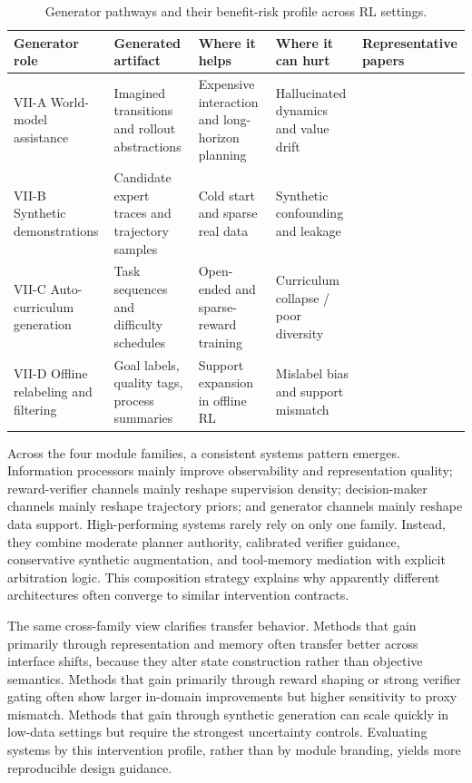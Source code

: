 \documentclass[pdflatex,sn-mathphys-num]{sn-jnl}
\begin{document}
\begin{table}[t]
\centering
\footnotesize
\setlength{\tabcolsep}{4pt}
\begin{tabularx}{\textwidth}{P{2.3cm}P{2.6cm}P{2.1cm}P{2.1cm}Y}
\toprule
\textbf{Generator role} & \textbf{Generated artifact} & \textbf{Where it helps} & \textbf{Where it can hurt} & \textbf{Representative papers}\\
\midrule
VII-A World-model assistance & Imagined transitions and rollout abstractions & Expensive interaction and long-horizon planning & Hallucinated dynamics and value drift & \cite{arxiv_p_2301_12050,arxiv_p_2602_02454,arxiv_p_2602_11075}\\
VII-B Synthetic demonstrations & Candidate expert traces and trajectory samples & Cold start and sparse real data & Synthetic confounding and leakage & \cite{arxiv_p_2310_20587,arxiv_p_2505_18098,arxiv_p_2601_08107}\\
VII-C Auto-curriculum generation & Task sequences and difficulty schedules & Open-ended and sparse-reward training & Curriculum collapse / poor diversity & \cite{arxiv_p_2512_16848,arxiv_p_2601_18225,arxiv_p_2601_20802}\\
VII-D Offline relabeling and filtering & Goal labels, quality tags, process summaries & Support expansion in offline RL & Mislabel bias and support mismatch & \cite{arxiv_p_2602_02137,arxiv_p_2602_03305,doi_p_10_14778_3685800_3685913}\\
\bottomrule
\end{tabularx}
\caption{Generator pathways and their benefit-risk profile across RL settings.}
\label{tab:t4_generator}
\end{table}

Across the four module families, a consistent systems pattern emerges. Information processors mainly improve observability and representation quality; reward-verifier channels mainly reshape supervision density; decision-maker channels mainly reshape trajectory priors; and generator channels mainly reshape data support. High-performing systems rarely rely on only one family. Instead, they combine moderate planner authority, calibrated verifier guidance, conservative synthetic augmentation, and tool-memory mediation with explicit arbitration logic. This composition strategy explains why apparently different architectures often converge to similar intervention contracts.

The same cross-family view clarifies transfer behavior. Methods that gain primarily through representation and memory often transfer better across interface shifts, because they alter state construction rather than objective semantics. Methods that gain primarily through reward shaping or strong verifier gating often show larger in-domain improvements but higher sensitivity to proxy mismatch. Methods that gain through synthetic generation can scale quickly in low-data settings but require the strongest uncertainty controls. Evaluating systems by this intervention profile, rather than by module branding, yields more reproducible design guidance.
\end{document}
